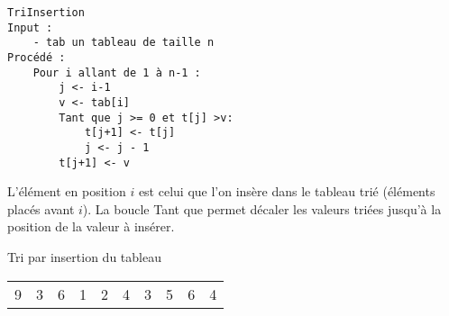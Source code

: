 \documentclass{../cours}
\begin{document}
\begin{lstlisting}
TriInsertion
Input :
    - tab un tableau de taille n
Procédé :
    Pour i allant de 1 à n-1 :
        j <- i-1
        v <- tab[i]
        Tant que j >= 0 et t[j] >v:
            t[j+1] <- t[j]
            j <- j - 1
        t[j+1] <- v
\end{lstlisting}

L'élément en position $i$ est celui que l'on insère dans le tableau trié (éléments placés avant $i$). La boucle Tant que permet décaler les valeurs triées jusqu'à la position 
de la valeur à insérer.

\begin{Example}
Tri par insertion du tableau

\begin{tabular}{cccccccccc}
9 & 3 & 6 & 1 & 2 & 4 & 3 & 5 & 6 & 4
\end{tabular}

\vspace{0.5cm}


\end{Example}
\end{document}
